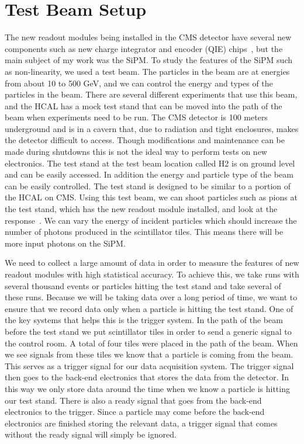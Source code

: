 \section{Test Beam Setup}


The new readout modules being installed in the CMS detector have several new components such as new charge integrator and encoder (QIE) chips~\cite{QIE, QIE2}, but the main subject of my work was the SiPM. To study the features of the SiPM such as non-linearity, we used a test beam. The particles in the beam are at energies from about 10 to 500 GeV, and we can control the energy and types of the particles in the beam. There are several different experiments that use this beam, and the HCAL has a mock test stand that can be moved into the path of the beam when experiments need to be run. The CMS detector is 100 meters underground and is in a cavern that, due to radiation and tight enclosures, makes the detector difficult to access. Though modifications and maintenance can be made during shutdowns this is not the ideal way to perform tests on new electronics. The test stand at the test beam location called H2 is on ground level and can be easily accessed. In addition the energy and particle type of the beam can be easily controlled. The test stand is designed to be similar to a portion of the HCAL on CMS. Using this test beam, we can shoot particles such as pions at the test stand, which has the new readout module installed, and look at the response~\cite{TB96, TB06}. We can vary the energy of incident particles which should increase the number of photons produced in the scintillator tiles. This means there will be more input photons on the SiPM.

We need to collect a large amount of data in order to measure the features of new readout modules with high statistical accuracy. To achieve this, we take runs with several thousand events or particles hitting the test stand and take several of these runs. Because we will be taking data over a long period of time, we want to ensure that we record data only when a particle is hitting the test stand. One of the key systems that helps this is the trigger system. In the path of the beam before the test stand we put scintillator tiles in order to send a generic signal to the control room. A total of four tiles were placed in the path of the beam. When we see signals from these tiles we know that a particle is coming from the beam. This serves as a trigger signal for our data acquisition system. The trigger signal then goes to the back-end electronics that stores the data from the detector. In this way we only store data around the time when we know a particle is hitting our test stand. There is also a ready signal that goes from the back-end electronics to the trigger. Since a particle may come before the back-end electronics are finished storing the relevant data, a trigger signal that comes without the ready signal will simply be ignored.

